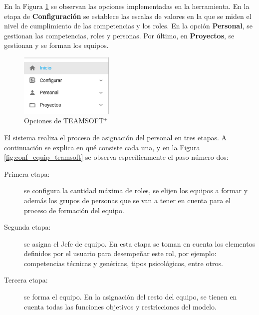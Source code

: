 En la Figura \ref{fig:opcines_teamsoft} se observan las opciones implementadas en la herramienta. En la etapa de \textbf{Configuración} se establece las escalas de valores en la que se miden el nivel de cumplimiento de las competencias y los roles. En la opción \textbf{Personal}, se gestionan las competencias, roles y personas. Por último, en \textbf{Proyectos}, se gestionan y se forman los equipos.\\

\begin{figure}[H]
	\centering
	\includegraphics[width=0.4\textwidth]{figuras/opciones_team_soft.png} 
	\caption{Opciones de TEAMSOFT$^+$}\label{fig:opcines_teamsoft}
\end{figure}

El sistema realiza el proceso de asignación del personal en tres etapas. A continuación se explica en qué consiste cada una, y en la Figura \ref{fig:conf_equip_teamsoft} se observa específicamente el paso número dos:
\begin{description}
	\item[Primera etapa:] se configura la cantidad máxima de roles, se elijen los equipos a formar y además los grupos de personas que se van a tener en cuenta para el proceso de formación del equipo.
	\item[Segunda etapa:] se asigna el Jefe de equipo. En esta etapa se toman en cuenta los elementos definidos por el usuario para desempeñar este rol, por ejemplo: competencias técnicas y genéricas, tipos psicológicos, entre otros.
	\item[Tercera etapa:] se forma el equipo. En la asignación del resto del equipo, se tienen en cuenta todas las funciones objetivos y restricciones del modelo.
\end{description}


